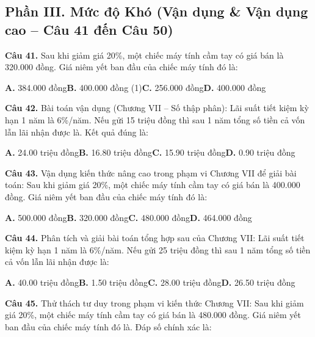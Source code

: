 \documentclass[11pt,a4paper]{article}
\begin{document}
\subsection*{\color{accent} Phần III. Mức độ Khó (Vận dụng \& Vận dụng cao -- Câu 41 đến Câu 50)}
\textbf{\color{primary} Câu 41.} Sau khi giảm giá 20\%, một chiếc máy tính cầm tay có giá bán là 320.000 đồng. Giá niêm yết ban đầu của chiếc máy tính đó là:\par
\hspace*{1.5em}\textbf{A.} 384.000 đồng\quad\quad \textbf{B.} 400.000 đồng (1)\quad\quad \textbf{C.} 256.000 đồng\quad\quad \textbf{D.} 400.000 đồng\par\vspace{2pt}
\textbf{\color{primary} Câu 42.} Bài toán vận dụng (Chương VII – Số thập phân): Lãi suất tiết kiệm kỳ hạn 1 năm là 6\%/năm. Nếu gửi 15 triệu đồng thì sau 1 năm tổng số tiền cả vốn lẫn lãi nhận được là. Kết quả đúng là:\par
\hspace*{1.5em}\textbf{A.} 24.00 triệu đồng\quad\quad \textbf{B.} 16.80 triệu đồng\quad\quad \textbf{C.} 15.90 triệu đồng\quad\quad \textbf{D.} 0.90 triệu đồng\par\vspace{2pt}
\textbf{\color{primary} Câu 43.} Vận dụng kiến thức nâng cao trong phạm vi Chương VII để giải bài toán: Sau khi giảm giá 20\%, một chiếc máy tính cầm tay có giá bán là 400.000 đồng. Giá niêm yết ban đầu của chiếc máy tính đó là:\par
\hspace*{1.5em}\textbf{A.} 500.000 đồng\quad\quad \textbf{B.} 320.000 đồng\quad\quad \textbf{C.} 480.000 đồng\quad\quad \textbf{D.} 464.000 đồng\par\vspace{2pt}
\textbf{\color{primary} Câu 44.} Phân tích và giải bài toán tổng hợp sau của Chương VII: Lãi suất tiết kiệm kỳ hạn 1 năm là 6\%/năm. Nếu gửi 25 triệu đồng thì sau 1 năm tổng số tiền cả vốn lẫn lãi nhận được là:\par
\hspace*{1.5em}\textbf{A.} 40.00 triệu đồng\quad\quad \textbf{B.} 1.50 triệu đồng\quad\quad \textbf{C.} 28.00 triệu đồng\quad\quad \textbf{D.} 26.50 triệu đồng\par\vspace{2pt}
\textbf{\color{primary} Câu 45.} Thử thách tư duy trong phạm vi kiến thức Chương VII: Sau khi giảm giá 20\%, một chiếc máy tính cầm tay có giá bán là 480.000 đồng. Giá niêm yết ban đầu của chiếc máy tính đó là. Đáp số chính xác là:\par
\end{document}
